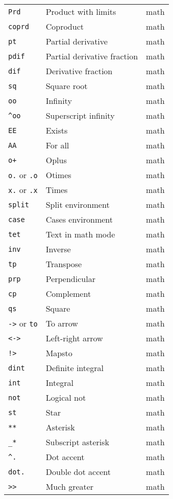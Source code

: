 \documentclass{article}
\begin{document}
\begin{longtable}{|p{}|p{}|p{}|}
\texttt{Prd} & Product with limits & math \\
\texttt{coprd} & Coproduct & math \\
\texttt{pt} & Partial derivative & math \\
\texttt{pdif} & Partial derivative fraction & math \\
\texttt{dif} & Derivative fraction & math \\
\texttt{sq} & Square root & math \\
\texttt{oo} & Infinity & math \\
\texttt{\^{}oo} & Superscript infinity & math \\
\texttt{EE} & Exists & math \\
\texttt{AA} & For all & math \\
\texttt{o+} & Oplus & math \\
\texttt{o.} or \texttt{.o} & Otimes & math \\
\texttt{x.} or \texttt{.x} & Times & math \\
\texttt{split} & Split environment & math \\
\texttt{case} & Cases environment & math \\
\texttt{tet} & Text in math mode & math \\
\texttt{inv} & Inverse & math \\
\texttt{tp} & Transpose & math \\
\texttt{prp} & Perpendicular & math \\
\texttt{cp} & Complement & math \\
\texttt{qs} & Square & math \\
\texttt{->} or \texttt{to} & To arrow & math \\
\texttt{<->} & Left-right arrow & math \\
\texttt{!>} & Mapsto & math \\
\texttt{dint} & Definite integral & math \\
\texttt{int} & Integral & math \\
\texttt{not} & Logical not & math \\
\texttt{st} & Star & math \\
\texttt{**} & Asterisk & math \\
\texttt{\_*} & Subscript asterisk & math \\
\texttt{\^{}.} & Dot accent & math \\
\texttt{dot.} & Double dot accent & math \\
\texttt{>>} & Much greater & math \\

\end{longtable}
\end{document}
